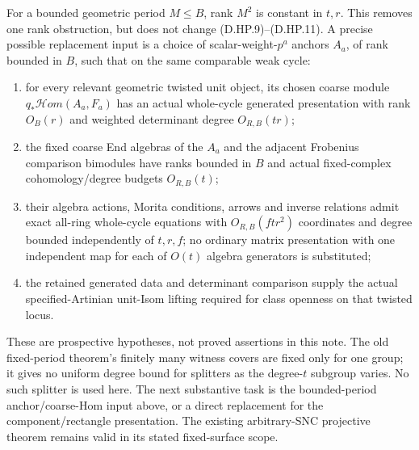For a bounded geometric period $M\le B$, rank $M^2$ is constant
in $t,r$. This removes one rank obstruction, but does not change
(D.HP.9)--(D.HP.11). A precise possible replacement input is a
choice of scalar-weight-$p^a$ anchors $A_a$, of rank bounded in
$B$, such that on the same comparable weak cycle:
\begin{enumerate}
\item for every relevant geometric twisted unit object, its
chosen coarse module $q_*\mathcal Hom(A_a,F_a)$ has an actual
whole-cycle generated presentation with rank $O_B(r)$ and
weighted determinant degree $O_{R,B}(tr)$;
\item the fixed coarse End algebras of the $A_a$ and the adjacent
Frobenius comparison bimodules have ranks bounded in $B$ and
actual fixed-complex cohomology/degree budgets $O_{R,B}(t)$;
\item their algebra actions, Morita conditions, arrows and inverse
relations admit exact all-ring whole-cycle equations with
$O_{R,B}(ftr^2)$ coordinates and degree bounded independently
of $t,r,f$; no ordinary matrix presentation with one independent
map for each of $O(t)$ algebra generators is substituted;
\item the retained generated data and determinant comparison
supply the actual specified-Artinian unit-Isom lifting required
for class openness on that twisted locus.
\end{enumerate}
These are prospective hypotheses, not proved assertions in this
note. The old fixed-period theorem's finitely many witness covers
are fixed only for one group; it gives no uniform degree bound
for splitters as the degree-$t$ subgroup varies. No such splitter
is used here. The next substantive task is the bounded-period
anchor/coarse-Hom input above, or a direct replacement for the
component/rectangle presentation. The existing arbitrary-SNC
projective theorem remains valid in its stated fixed-surface scope.
